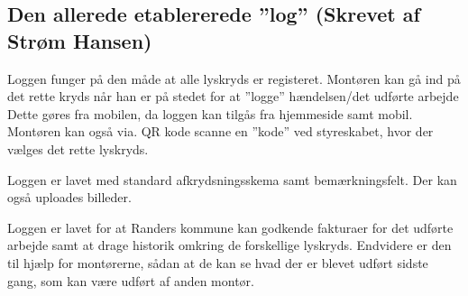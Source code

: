 	\subsection{Den allerede etablererede ”log” (Skrevet af Strøm Hansen)}
	Loggen funger på den måde at alle lyskryds er registeret.
	Montøren kan gå ind på det rette kryds når han er på stedet for at ”logge” hændelsen/det udførte arbejde
	Dette gøres fra mobilen, da loggen kan tilgås fra hjemmeside samt mobil. Montøren kan også via. QR kode scanne en ”kode” ved styreskabet, hvor der vælges det rette lyskryds. 
	
	Loggen er lavet med standard afkrydsningsskema samt bemærkningsfelt. Der kan også uploades billeder.
	
	Loggen er lavet for at Randers kommune kan godkende fakturaer for det udførte arbejde samt at drage historik omkring de forskellige lyskryds. Endvidere er den til hjælp for montørerne, sådan at de kan se hvad der er blevet udført sidste gang, som kan være udført af anden montør.